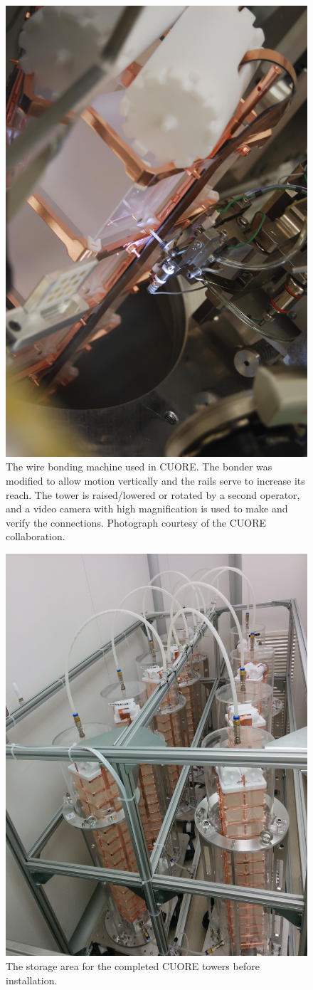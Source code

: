 \begin{figure}[htbp]
    \centering
    \includegraphics[width=0.6\linewidth, angle=270, origin=c]{Figures/bonding_machine.jpg}
    \caption[The wire bonding machine used in CUORE]
    {The wire bonding machine used in CUORE.
    The bonder was modified to allow motion vertically and the rails serve to increase its reach.
    The tower is raised/lowered or rotated by a second operator, and a video camera with high magnification is used to make and verify the connections.
    Photograph courtesy of the CUORE collaboration.}
    \label{fig:bonding_machine}
\end{figure}

\begin{figure}[htbp]
    \centering
    \includegraphics[width=0.5\linewidth]{Figures/cuore_towers_pic1.jpg}
    \caption[The storage area for the completed CUORE towers before installation]
    {The storage area for the completed CUORE towers before installation.}
    \label{fig:tower_storage}
\end{figure}

